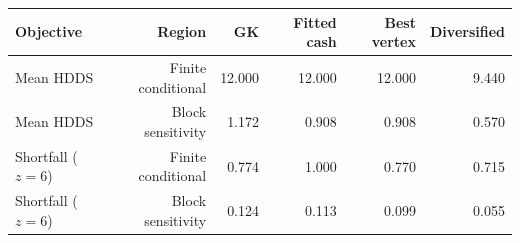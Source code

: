 \begin{tabular}{lrrrrr}
\toprule
Objective & Region & GK & Fitted cash & Best vertex & Diversified \\
\midrule
Mean HDDS & Finite conditional & 12.000 & 12.000 & 12.000 & 9.440 \\
Mean HDDS & Block sensitivity & 1.172 & 0.908 & 0.908 & 0.570 \\
Shortfall ($z=6$) & Finite conditional & 0.774 & 1.000 & 0.770 & 0.715 \\
Shortfall ($z=6$) & Block sensitivity & 0.124 & 0.113 & 0.099 & 0.055 \\
\bottomrule
\end{tabular}
